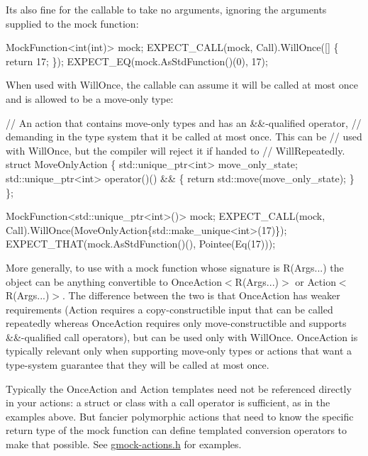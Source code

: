 It\textquotesingle{}s also fine for the callable to take no arguments, ignoring the arguments supplied to the mock function\+:


\begin{DoxyCode}
MockFunction<int(int)> mock;
EXPECT\_CALL(mock, Call).WillOnce([] \{ \textcolor{keywordflow}{return} 17; \});
EXPECT\_EQ(mock.AsStdFunction()(0), 17);
\end{DoxyCode}


When used with {\ttfamily Will\+Once}, the callable can assume it will be called at most once and is allowed to be a move-\/only type\+:


\begin{DoxyCode}
\textcolor{comment}{// An action that contains move-only types and has an &&-qualified operator,}
\textcolor{comment}{// demanding in the type system that it be called at most once. This can be}
\textcolor{comment}{// used with WillOnce, but the compiler will reject it if handed to}
\textcolor{comment}{// WillRepeatedly.}
\textcolor{keyword}{struct }MoveOnlyAction \{
  std::unique\_ptr<int> move\_only\_state;
  std::unique\_ptr<int> operator()() && \{ \textcolor{keywordflow}{return} std::move(move\_only\_state); \}
\};

MockFunction<std::unique\_ptr<int>()> mock;
EXPECT\_CALL(mock, Call).WillOnce(MoveOnlyAction\{std::make\_unique<int>(17)\});
EXPECT\_THAT(mock.AsStdFunction()(), Pointee(Eq(17)));
\end{DoxyCode}


More generally, to use with a mock function whose signature is {\ttfamily R(Args...)} the object can be anything convertible to {\ttfamily Once\+Action$<$R(Args...)$>$} or {\ttfamily Action$<$R(Args...)}$>$. The difference between the two is that {\ttfamily Once\+Action} has weaker requirements ({\ttfamily Action} requires a copy-\/constructible input that can be called repeatedly whereas {\ttfamily Once\+Action} requires only move-\/constructible and supports {\ttfamily \&\&}-\/qualified call operators), but can be used only with {\ttfamily Will\+Once}. {\ttfamily Once\+Action} is typically relevant only when supporting move-\/only types or actions that want a type-\/system guarantee that they will be called at most once.

Typically the {\ttfamily Once\+Action} and {\ttfamily Action} templates need not be referenced directly in your actions\+: a struct or class with a call operator is sufficient, as in the examples above. But fancier polymorphic actions that need to know the specific return type of the mock function can define templated conversion operators to make that possible. See {\ttfamily \mbox{\hyperlink{gmock-actions_8h_source}{gmock-\/actions.\+h}}} for examples.

